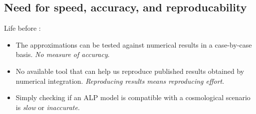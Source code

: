 \documentclass[10pt,utf8,compress,xcolor=dvipsnames]{beamer}
\begin{document}
\subsection{Need for speed, accuracy, and reproducability}
\begin{frame}{\insertsubsectionhead}



	Life before \mimes: \\[0cm]
	\begin{itemize}
		\item The approximations can be tested against numerical results in a case-by-case basis. \emph{No measure of accuracy}. %
		\item No available tool that can help us reproduce published results obtained by numerical integration. \emph{Reproducing results means reproducing effort}.
		\item Simply checking if an ALP model is compatible with a cosmological scenario is \emph{slow} or \emph{inaccurate}. 
	\end{itemize}
	
	
	
\end{frame}




\section{\mimes}
\end{document}
